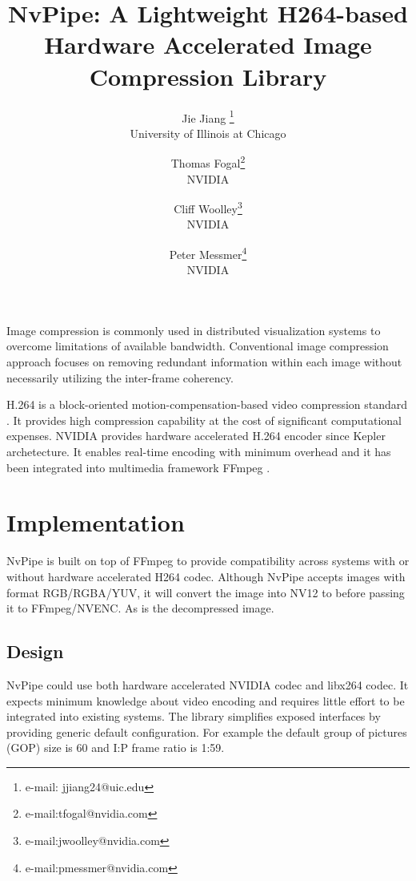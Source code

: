 \documentclass{vgtc}                          %
\title{NvPipe: A Lightweight H264-based Hardware Accelerated Image Compression Library}
\author{Jie Jiang \thanks{e-mail: jjiang24@uic.edu}\\ %
        \scriptsize University of Illinois at Chicago %
\and Thomas Fogal\thanks{e-mail:tfogal@nvidia.com}\\ %
     \scriptsize NVIDIA %
\and Cliff Woolley\thanks{e-mail:jwoolley@nvidia.com}\\ %
     \scriptsize NVIDIA %
\and Peter Messmer\thanks{e-mail:pmessmer@nvidia.com}\\ %
     \scriptsize NVIDIA} %
\begin{document}


\maketitle

Image compression is commonly used in distributed visualization systems to overcome limitations of available bandwidth. Conventional image compression approach focuses on removing redundant information within each image without necessarily utilizing the inter-frame coherency.

H.264 is a block-oriented motion-compensation-based video compression standard \cite{wiegand2003overview}. It provides high compression capability at the cost of significant computational expenses. NVIDIA provides hardware accelerated H.264 encoder since Kepler archetecture. It enables real-time encoding with minimum overhead and it has been integrated into multimedia framework FFmpeg \cite{ffmpeg}. 

\section{Implementation}

NvPipe is built on top of FFmpeg to provide compatibility across systems with or without hardware accelerated H264 codec. Although NvPipe accepts images with format RGB/RGBA/YUV, it will convert the image into NV12 to before passing it to FFmpeg/NVENC. As is the decompressed image.

\subsection{Design}

NvPipe could use both hardware accelerated NVIDIA codec and libx264 codec. It expects minimum knowledge about video encoding and requires little effort to be integrated into existing systems. The library simplifies exposed interfaces by providing generic default configuration. For example the default group of pictures (GOP) size is 60 and I:P frame ratio is 1:59.
\end{document}
